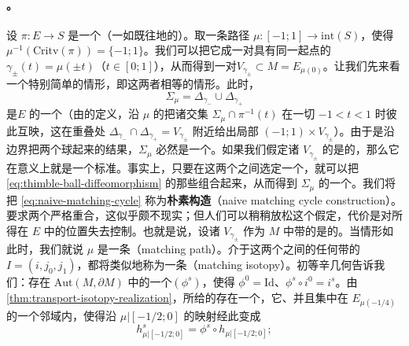 \paragraph{\trMatchingCycle{}。}\label{sub:matching-cycles}
设 $\pi\colon E\to S$ 是一个（一如既往地\trExact{}的）\trLefschetzFibration。取一条\trEmbedding{}路径 $\mu\colon[-1;1]\to\mathrm{int}(S)$，使得 $\mu^{-1}(\mathrm{Critv}(\pi))=\{-1;1\}$。我们可以把它\trSplitting{}成一对具有同一起点的\trVanishingPath{}$\gamma_\pm(t)=\mu(\pm t)$（$t\in[0;1]$），从而得到一对\trVanishingCycle{}$V_{\gamma_\pm}\subset M=E_{\mu(0)}$。让我们先来看一个特别简单的情形，即这两者相等的情形。此时，
\begin{equation}\label{eq:naive-matching-cycle}
\Sigma_\mu=\Delta_{\gamma_-}\cup\Delta_{\gamma_+}
\end{equation}
是\trTotalSpace{}$E$ 的一个\trSmooth\trLagrange\trSubmanifold（由\trLefschetzThimble{}的定义，沿 $\mu$ 的\trParallelTransport{}把诸交集 $\Sigma_\mu\cap\pi^{-1}(t)$ 在一切 $-1<t<1$ 时彼此互映，这在重叠处 $\Delta_{\gamma_-}\cap\Delta_{\gamma_+}=V_{\gamma_\pm}$ 附近给出局部\trChart{} $(-1;1)\times V_{\gamma_\pm}$）。由于是沿边界把两个球\trGluing{}起来的结果，$\Sigma_\mu$ 必然是一个\trHomotopy\trSphere。如果我们假定诸 $V_{\gamma_\pm}$ 的\trFrame{}是\trIsotopy{}的，那么它在\trDifferential{}意义上就是一个标准\trSphere。事实上，只要在这两个\trFrame{}之间选定一个\trIsotopy，就可以把 \eqref{eq:thimble-ball-diffeomorphism} 的那些\trDiffeomorphism{}组合起来，从而得到 $\Sigma_\mu$ 的一个\trFrame。我们将把 \eqref{eq:naive-matching-cycle} 称为\textbf{朴素\trMatchingCycle{}构造}（naive matching cycle construction）。
要求两个\trVanishingCycle{}严格重合，这似乎颇不现实；但人们可以稍稍放松这个假定，代价是对所得\trSphere{}在 $E$ 中的位置失去控制。也就是说，设诸 $V_{\gamma_\pm}$ 作为 $M$ 中带\trFrame{}的\trExact\trLagrange\trSphere{}是\trIsotopy{}的。当情形如此时，我们就说 $\mu$ 是一条\textbf{\trMatchingPath}（matching path）。介于这两个\trVanishingCycle{}之间的任何带\trFrame{}的\trExact\trLagrange\trIsotopy{}$I=(i,j_0,j_1)$，都将类似地称为一条\textbf{\trMatchingIsotopy}（matching isotopy）。初等辛几何告诉我们：存在 $\mathrm{Aut}(M,\partial M)$ 中的一个\trIsotopy{}$(\phi^s)$，使得 $\phi^0=\mathrm{Id}$、$\phi^s\circ i^0=i^s$。由\cref{thm:transport-isotopy-realization}，所给的\trExact\trLefschetzFibration{}存在一个\trDeformation，它\trConstantAlongFibres、并且集中在 $E_{\mu(-1/4)}$ 的一个邻域内，使得沿 $\mu|[-1/2;0]$ 的\trParallelTransport{}映射经此\trDeformation{}变成
\begin{equation*}
h^s_{\mu|[-1/2;0]}=\phi^s\circ h_{\mu|[-1/2;0]};
\end{equation*}
